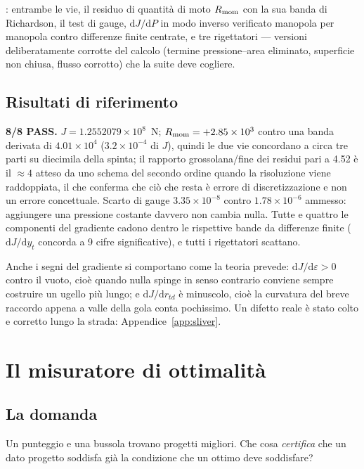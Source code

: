 : entrambe le vie, il
residuo di quantità di moto $R_{\rm mom}$ con la sua banda di
Richardson, il test di gauge, $\mathrm{d}J/\mathrm{d}P$ in modo
inverso verificato manopola per manopola contro differenze finite
centrate, e tre rigettatori --- versioni deliberatamente corrotte
del calcolo (termine pressione--area eliminato, superficie non
chiusa, flusso corrotto) che la suite deve cogliere.

\subsection{Risultati di riferimento}

\textbf{8/8 PASS.} $J = 1.2552079\times10^{8}$~N; $R_{\rm mom} =
+2.85\times10^{3}$ contro una banda derivata di
$4.01\times10^{4}$ ($3.2\times10^{-4}$ di $J$), quindi le due vie
concordano a circa tre parti su diecimila della spinta; il rapporto
grossolana/fine dei residui pari a 4.52 è il $\approx 4$ atteso da
uno schema del secondo ordine quando la risoluzione viene
raddoppiata, il che conferma che ciò che resta è errore di
discretizzazione e non un errore concettuale. Scarto di gauge
$3.35\times10^{-8}$ contro $1.78\times10^{-6}$ ammesso: aggiungere
una pressione costante davvero non cambia nulla. Tutte e quattro le
componenti del gradiente cadono dentro le rispettive bande da
differenze finite ($\mathrm{d}J/\mathrm{d}y_t$ concorda a 9 cifre
significative), e tutti i rigettatori scattano.

Anche i segni del gradiente si comportano come la teoria prevede:
$\mathrm{d}J/\mathrm{d}\varepsilon > 0$ contro il vuoto, cioè
quando nulla spinge in senso contrario conviene sempre costruire un
ugello più lungo; e $\mathrm{d}J/\mathrm{d}r_{td}$ è minuscolo,
cioè la curvatura del breve raccordo appena a valle della gola conta
pochissimo. Un difetto reale è stato colto e corretto lungo la
strada: Appendice~\ref{app:sliver}.

\section{Il misuratore di ottimalità}
\label{sec:corner}

\subsection{La domanda}

Un punteggio e una bussola trovano progetti migliori. Che cosa
\emph{certifica} che un dato progetto soddisfa già la condizione che
un ottimo deve soddisfare?

